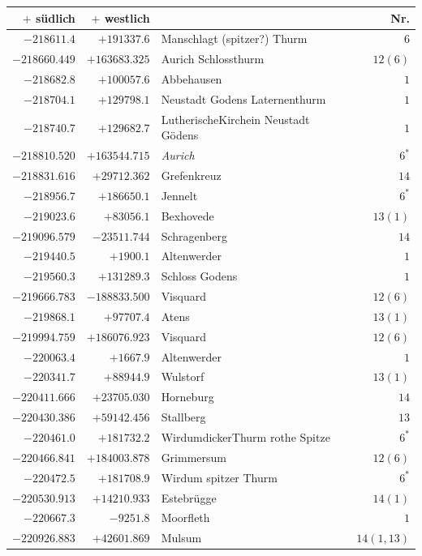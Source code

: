 \clearpage
\begin{center}\begingroup\fontsize{8}{9}\selectfont
\setlength{\tabcolsep}{4pt}
\begin{tabular}{r|r|p{170pt}|r}\hline
\(+\) südlich&\(+\) westlich&&Nr.\\\hline
\(-218611.4\)&\(+191337.6\)&Manschlagt (spitzer?) Thurm&\(6\)\\
\(-218660.449\)&\(+163683.325\)&Aurich Schlossthurm&\(12 (6)\)\\
\(-218682.8\)&\(+100057.6\)&Abbehausen&\(1\)\\
\(-218704.1\)&\(+129798.1\)&Neustadt Godens Laternenthurm&\(1\)\\
\(-218740.7\)&\(+129682.7\)&LutherischeKirchein Neustadt Gödens&\(1\)\\
\(-218810.520\)&\(+163544.715\)&\textit{Aurich}&\(6^{*}\)\\
\(-218831.616\)&\(+29712.362\)&Grefenkreuz&\(14\)\\
\(-218956.7\)&\(+186650.1\)&Jennelt&\(6^{*}\)\\
\(-219023.6\)&\(+83056.1\)&Bexhovede&\(13 (1)\)\\
\(-219096.579\)&\(-23511.744\)&Schragenberg&\(14\)\\
\(-219440.5\)&\(+1900.1\)&Altenwerder&\(1\)\\
\(-219560.3\)&\(+131289.3\)&Schloss Godens&\(1\)\\
\(-219666.783\)&\(-188833.500\)&Visquard&\(12 (6)\)\\
\(-219868.1\)&\(+97707.4\)&Atens&\(13 (1)\)\\
\(-219994.759\)&\(+186076.923\)&Visquard&\(12 (6)\)\\
\(-220063.4\)&\(+1667.9\)&Altenwerder&\(1\)\\
\(-220341.7\)&\(+88944.9\)&Wulstorf&\(13 (1)\)\\
\(-220411.666\)&\(+23705.030\)&Horneburg&\(14\)\\
\(-220430.386\)&\(+59142.456\)&Stallberg&\(13\)\\
\(-220461.0\)&\(+181732.2\)&WirdumdickerThurm rothe Spitze&\(6^{*}\)\\
\(-220466.841\)&\(+184003.878\)&Grimmersum&\(12 (6)\)\\
\(-220472.5\)&\(+181708.9\)&Wirdum spitzer Thurm&\(6^{*}\)\\
\(-220530.913\)&\(+14210.933\)&Estebrügge&\(14 (1)\)\\
\(-220667.3\)&\(-9251.8\)&Moorfleth&\(1\)\\
\(-220926.883\)&\(+42601.869\)&Mulsum&\(14(1,13)\)\\

\end{tabular}
\end{center}
